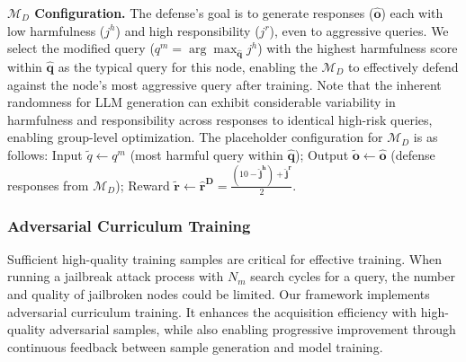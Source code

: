 \documentclass[11pt]{article}
\begin{document}
\textbf{$\mathcal{M}_{D}$ Configuration.} The defense’s goal is to generate responses ($\mathbf{\hat{o}}$) each with low harmfulness ($j^h$) and high responsibility ($j^r$), even to aggressive queries. We select the modified query ($q^{m} =\arg\max_{\mathbf{\hat{q}}} j^h$) with the highest harmfulness score within $\mathbf{\hat{q}}$ as the typical query for this node, enabling the $\mathcal{M}_{D}$ to effectively defend against the node's most aggressive query after training. Note that the inherent randomness for LLM generation can exhibit considerable variability in harmfulness and responsibility across responses to identical high-risk queries, enabling group-level optimization. The placeholder configuration for $\mathcal{M}_{D}$ is as follows: Input $\widetilde{q} \leftarrow q^{m}$ (most harmful query within $\mathbf{\hat{q}}$); Output $\mathbf{\widetilde{o}} \leftarrow \mathbf{\hat{o}}$ (defense responses from $\mathcal{M}_{D}$); Reward  $\mathbf{\widetilde{r}} \leftarrow \mathbf{\hat{r}^{D}} = \frac{(10-\mathbf{\hat{j}^{h}}) + \mathbf{\hat{j}^{r}}}{2}$.


 

 
\subsubsection{Adversarial Curriculum Training} Sufficient high-quality training samples are critical for effective training. When running a jailbreak attack process with $N_{m}$ search cycles for a query, the number and quality of jailbroken nodes could be limited. Our framework implements adversarial curriculum training. It enhances the acquisition efficiency with high-quality adversarial samples, while also enabling progressive improvement through continuous feedback between sample generation and model training.
 
\end{document}
